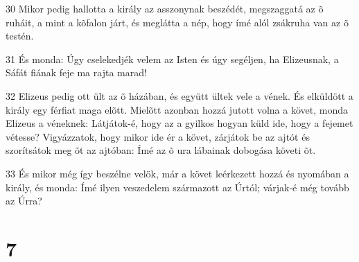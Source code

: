 \par 30 Mikor pedig hallotta a király az asszonynak beszédét, megszaggatá az õ ruháit, a mint a kõfalon járt, és meglátta a nép, hogy ímé alól zsákruha van az õ testén.
\par 31 És monda: Úgy cselekedjék velem az Isten és úgy segéljen, ha Elizeusnak, a Sáfát fiának feje ma rajta marad!
\par 32 Elizeus pedig ott ült az õ házában, és együtt ültek vele a vének. És elküldött a király egy férfiat maga elõtt. Mielõtt azonban hozzá jutott volna a követ, monda Elizeus a véneknek: Látjátok-é, hogy az a gyilkos hogyan küld ide, hogy a fejemet vétesse? Vigyázzatok, hogy mikor ide ér a követ, zárjátok be az ajtót és szorítsátok meg õt az ajtóban: Ímé az õ ura  lábainak dobogása követi õt.
\par 33 És mikor még így beszélne velök, már a követ leérkezett hozzá és nyomában a király, és monda: Ímé ilyen veszedelem származott az Úrtól; várjak-é még tovább az Úrra?

\chapter{7}

